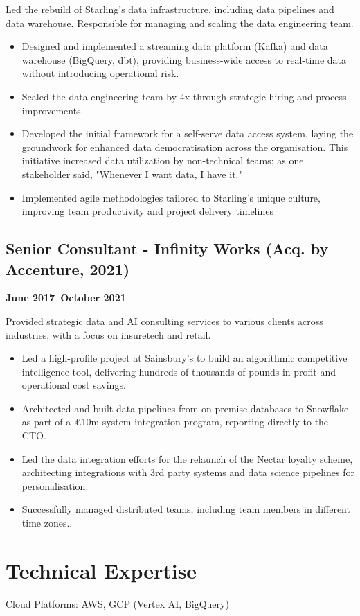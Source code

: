 \documentclass[a4paper]{scrartcl}
\begin{document}
Led the rebuild of Starling's data infrastructure, including data pipelines and data warehouse. Responsible for managing and scaling the data engineering team.
\begin{itemize}
	\item Designed and implemented a streaming data platform (Kafka) and data warehouse (BigQuery, dbt), providing business-wide access to real-time data without introducing operational risk.
	\item Scaled the data engineering team by 4x through strategic hiring and process improvements.
	\item Developed the initial framework for a self-serve data access system, laying the groundwork for enhanced data democratisation across the organisation. This initiative increased data utilization by non-technical teams; as one stakeholder said, "Whenever I want data, I have it."
	\item Implemented agile methodologies tailored to Starling's unique culture, improving team productivity and project delivery timelines
\end{itemize}

\subsection*{Senior Consultant - Infinity Works (Acq. by Accenture, 2021)}
\textbf{June 2017--October 2021}

Provided strategic data and AI consulting services to various clients across industries, with a focus on insuretech and retail.
\begin{itemize}
	\item Led a high-profile project at Sainsbury's to build an algorithmic competitive intelligence tool, delivering hundreds of thousands of pounds in profit and operational cost savings.
	\item Architected and built data pipelines from on-premise databases to Snowflake as part of a £10m system integration program, reporting directly to the CTO.
	\item Led the data integration efforts for the relaunch of the Nectar loyalty scheme, architecting integrations with 3rd party systems and data science pipelines for personalisation.
	\item Successfully managed distributed teams, including team members in different time zones..
\end{itemize}

\section*{Technical Expertise}
Cloud Platforms: AWS, GCP (Vertex AI, BigQuery)
\end{document}
